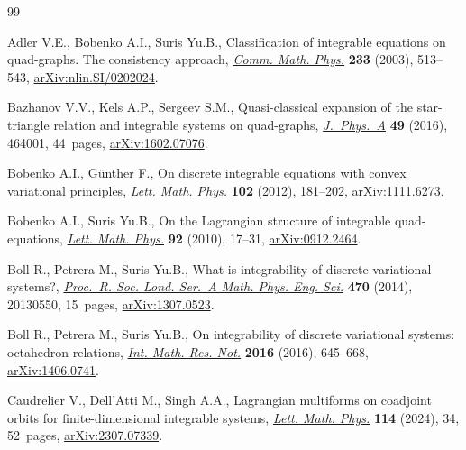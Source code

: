 \begin{thebibliography}{99}
\footnotesize\itemsep=0pt

Adler V.E., Bobenko A.I., Suris Yu.B., Classification of integrable equations on
 quad-graphs. {T}he consistency approach,
 \href{https://doi.org/10.1007/s00220-002-0762-8}{\textit{Comm. Math. Phys.}}
 \textbf{233} (2003), 513--543,
 \href{http://arxiv.org/abs/nlin.SI/0202024}{arXiv:nlin.SI/0202024}.

Bazhanov V.V., Kels A.P., Sergeev S.M., Quasi-classical expansion of the
 star-triangle relation and integrable systems on quad-graphs,
 \href{https://doi.org/10.1088/1751-8113/49/46/464001}{\textit{J.~Phys.~A}}
 \textbf{49} (2016), 464001, 44~pages,
 \href{http://arxiv.org/abs/1602.07076}{arXiv:1602.07076}.

Bobenko A.I., G\"unther F., On discrete integrable equations with convex
 variational principles,
 \href{https://doi.org/10.1007/s11005-012-0583-4}{\textit{Lett. Math. Phys.}}
 \textbf{102} (2012), 181--202,
 \href{http://arxiv.org/abs/1111.6273}{arXiv:1111.6273}.

Bobenko A.I., Suris Yu.B., On the {L}agrangian structure of integrable
 quad-equations,
 \href{https://doi.org/10.1007/s11005-010-0381-9}{\textit{Lett. Math. Phys.}}
 \textbf{92} (2010), 17--31,
 \href{http://arxiv.org/abs/0912.2464}{arXiv:0912.2464}.

Boll R., Petrera M., Suris Yu.B., What is integrability of discrete variational
 systems?, \href{https://doi.org/10.1098/rspa.2013.0550}{\textit{Proc.~R. Soc.
 Lond. Ser.~A Math. Phys. Eng. Sci.}} \textbf{470} (2014), 20130550, 15~pages,
 \href{http://arxiv.org/abs/1307.0523}{arXiv:1307.0523}.

Boll R., Petrera M., Suris Yu.B., On integrability of discrete variational
 systems: octahedron relations,
 \href{https://doi.org/10.1093/imrn/rnv140}{\textit{Int. Math. Res. Not.}} \textbf{2016} (2016), 645--668,
 \href{http://arxiv.org/abs/1406.0741}{arXiv:1406.0741}.

Caudrelier V., Dell'Atti M., Singh A.A., Lagrangian multiforms on coadjoint
 orbits for finite-dimensional integrable systems,
 \href{https://doi.org/10.1007/s11005-023-01766-9}{\textit{Lett. Math. Phys.}}
 \textbf{114} (2024), 34, 52~pages,
 \href{http://arxiv.org/abs/2307.07339}{arXiv:2307.07339}.


\end{thebibliography}
